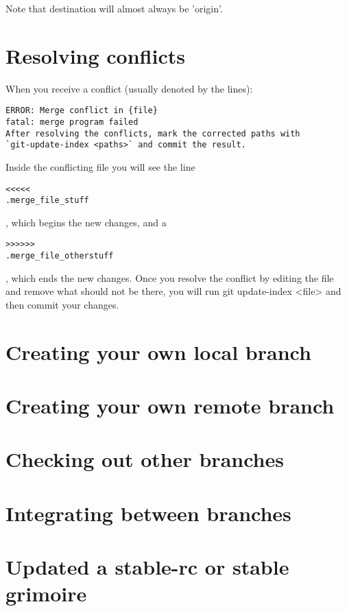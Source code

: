 \documentclass[a4paper,10pt]{book}
\begin{document}
Note that destination will almost always be 'origin'.

\section{Resolving conflicts}
When you receive a conflict (usually denoted by the lines):
\begin{verbatim}
ERROR: Merge conflict in {file}
fatal: merge program failed
After resolving the conflicts, mark the corrected paths with
`git-update-index <paths>` and commit the result.
\end{verbatim}

Inside the conflicting file you will see the line \begin{verbatim}<<<<<
.merge_file_stuff\end{verbatim},
which begins the new changes, and a \begin{verbatim}>>>>>>
.merge_file_otherstuff\end{verbatim}, which
ends the new changes. Once you resolve the conflict by editing the file
and remove what should not be there, you will run \textdollar git update-index
<file>
and then commit your changes.
\section{Creating your own local branch}
\section{Creating your own remote branch}
\section{Checking out other branches}
\section{Integrating between branches}
\section{Updated a stable-rc or stable grimoire}
\end{document}
